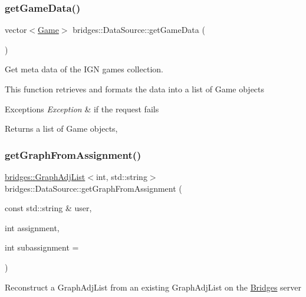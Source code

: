 \subsubsection{\texorpdfstring{get\+Game\+Data()}{getGameData()}}
{\footnotesize\ttfamily vector$<$\hyperlink{classbridges_1_1dataset_1_1_game}{Game}$>$ bridges\+::\+Data\+Source\+::get\+Game\+Data (\begin{DoxyParamCaption}{ }\end{DoxyParamCaption})\hspace{0.3cm}{\ttfamily [inline]}}

Get meta data of the I\+GN games collection.

This function retrieves and formats the data into a list of Game objects


\begin{DoxyExceptions}{Exceptions}
{\em Exception} & if the request fails\\
\hline
\end{DoxyExceptions}
\begin{DoxyReturn}{Returns}
a list of Game objects, 
\end{DoxyReturn}
\mbox{\label{classbridges_1_1_data_source_ac4edf55c163c60f17b13f5499e5d2e65}} 
\subsubsection{\texorpdfstring{get\+Graph\+From\+Assignment()}{getGraphFromAssignment()}}
{\footnotesize\ttfamily \hyperlink{classbridges_1_1datastructure_1_1_graph_adj_list}{bridges\+::\+Graph\+Adj\+List}$<$int, std\+::string$>$ bridges\+::\+Data\+Source\+::get\+Graph\+From\+Assignment (\begin{DoxyParamCaption}\item[{const std\+::string \&}]{user,  }\item[{int}]{assignment,  }\item[{int}]{subassignment = {} }\end{DoxyParamCaption})\hspace{0.3cm}{\ttfamily [inline]}}

Reconstruct a Graph\+Adj\+List from an existing Graph\+Adj\+List on the \hyperlink{classbridges_1_1_bridges}{Bridges} server


